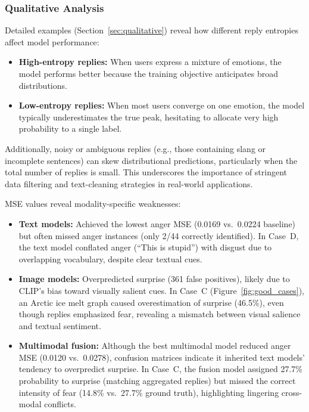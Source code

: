 \subsubsection*{Qualitative Analysis}
Detailed examples (Section~\ref{sec:qualitative}) reveal how different reply entropies affect model performance:
\begin{itemize}
    \item \textbf{High-entropy replies:} When users express a mixture of emotions, the model performs better because the training objective anticipates broad distributions.
    \item \textbf{Low-entropy replies:} When most users converge on one emotion, the model typically underestimates the true peak, hesitating to allocate very high probability to a single label.
\end{itemize}
Additionally, noisy or ambiguous replies (e.g., those containing slang or incomplete sentences) can skew distributional predictions, particularly when the total number of replies is small. This underscores the importance of stringent data filtering and text-cleaning strategies in real-world applications.
\newline

\noindent
MSE values reveal modality-specific weaknesses:
\begin{itemize}
    \item \textbf{Text models:} Achieved the lowest anger MSE (0.0169 vs.\ 0.0224 baseline) but often missed anger instances (only 2/44 correctly identified). In Case~D, the text model conflated anger (``This is stupid'') with disgust due to overlapping vocabulary, despite clear textual cues.
    \item \textbf{Image models:} Overpredicted surprise (361 false positives), likely due to CLIP's bias toward visually salient cues. In Case~C (Figure~\ref{fig:good_cases}), an Arctic ice melt graph caused overestimation of surprise (46.5\%), even though replies emphasized fear, revealing a mismatch between visual salience and textual sentiment.
    \item \textbf{Multimodal fusion:} Although the best multimodal model reduced anger MSE (0.0120 vs.\ 0.0278), confusion matrices indicate it inherited text models' tendency to overpredict surprise. In Case~C, the fusion model assigned 27.7\% probability to surprise (matching aggregated replies) but missed the correct intensity of fear (14.8\% vs.\ 27.7\% ground truth), highlighting lingering cross-modal conflicts.
\end{itemize}

